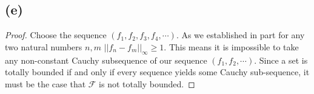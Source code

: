 \documentclass{article}
\theoremstyle{definition}
\begin{document}
\subsection*{(e)}
    \begin{proof}
        Choose the sequence $(f_1, f_2, f_3, f_4, \cdots)$. As we established in part  for any two natural numbers $n,m$
        $||f_n - f_m||_\infty \geqslant 1$. This means it is impossible to take any non-constant Cauchy subsequence of our sequence $(f_1, f_2, \cdots)$.
        Since a set is totally bounded if and only if every sequence yields some Cauchy sub-sequence, it must be the case that $\mathcal{F}$ is not totally bounded.
    \end{proof}
\end{document}
